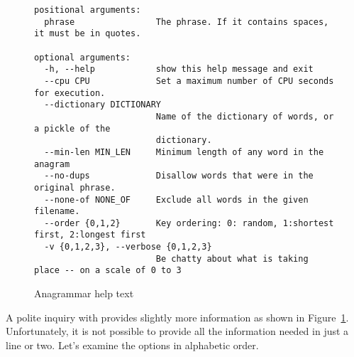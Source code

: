 \documentclass[letterpaper, 11pt]{article}
\begin{document}
\begin{figure}
\small
\begin{verbatim}
positional arguments:
  phrase                The phrase. If it contains spaces, it must be in quotes.

optional arguments:
  -h, --help            show this help message and exit
  --cpu CPU             Set a maximum number of CPU seconds for execution.
  --dictionary DICTIONARY
                        Name of the dictionary of words, or a pickle of the
                        dictionary.
  --min-len MIN_LEN     Minimum length of any word in the anagram
  --no-dups             Disallow words that were in the original phrase.
  --none-of NONE_OF     Exclude all words in the given filename.
  --order {0,1,2}       Key ordering: 0: random, 1:shortest first, 2:longest first
  -v {0,1,2,3}, --verbose {0,1,2,3}
                        Be chatty about what is taking place -- on a scale of 0 to 3
\end{verbatim}
\normalsize
\caption{Anagrammar help text}
\label{fig:helptext}
\end{figure}

A polite inquiry with  provides slightly more information as shown
in Figure~\ref{fig:helptext}. Unfortunately, it is not possible to provide
all the information needed in just a line or two. Let's examine the options
in alphabetic order.
\end{document}
